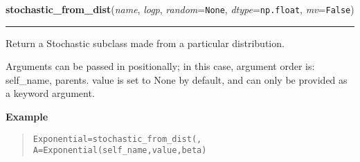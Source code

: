     \label{pymc:distributions:stochastic_from_dist}

    \vspace{0.5ex}

    \begin{boxedminipage}{\textwidth}

    \raggedright \textbf{stochastic\_from\_dist}(\textit{name}, \textit{logp}, \textit{random}=\texttt{None}, \textit{dtype}=\texttt{np.float}, \textit{mv}=\texttt{False})

    \vspace{-1.5ex}

    \rule{\textwidth}{0.5\fboxrule}

Return a Stochastic subclass made from a particular distribution.
\begin{quote}
\end{quote}

Arguments can be passed in positionally; in this case, argument order is: self{\_}name, parents.
value is set to None by default, and can only be provided as a keyword argument.
    \vspace{1ex}

      \textbf{Example}
      \begin{quote}
          \begin{alltt}
\pysrcprompt{{\textgreater}{\textgreater}{\textgreater} }Exponential = stochastic\_from\_dist(,
\pysrcoutput{}\pysrcprompt{{\textgreater}{\textgreater}{\textgreater} }A = Exponential(self\_name, value, beta)\end{alltt}
      \end{quote}

    \vspace{1ex}

    \end{boxedminipage}

    \label{pymc:distributions:Vectorize}

    \vspace{0.5ex}

